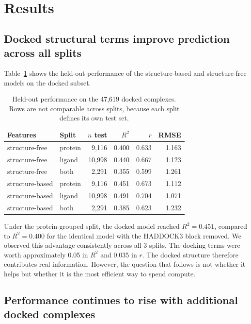 \documentclass[times, twoside]{zHenriquesLab-StyleBioRxiv}
\begin{document}
\section*{Results}

\subsection*{Docked structural terms improve prediction across all splits}

Table~\ref{tab:phase1} shows the held-out performance of the structure-based and structure-free models on the docked subset.

\begin{table}[h]
\centering
\caption{Held-out performance on the 47,619 docked complexes. Rows are not comparable across splits, because each split defines its own test set.}
\label{tab:phase1}
\small
\begin{tabular}{llrrrr}
\toprule
Features & Split & $n$ test & $R^2$ & $r$ & RMSE \\
\midrule
structure-free  & protein & 9,116  & 0.400 & 0.633 & 1.163 \\
structure-free  & ligand  & 10,998 & 0.440 & 0.667 & 1.123 \\
structure-free  & both    & 2,291  & 0.355 & 0.599 & 1.261 \\
structure-based & protein & 9,116  & 0.451 & 0.673 & 1.112 \\
structure-based & ligand  & 10,998 & 0.491 & 0.704 & 1.071 \\
structure-based & both    & 2,291  & 0.385 & 0.623 & 1.232 \\
\bottomrule
\end{tabular}
\end{table}

Under the protein-grouped split, the docked model reached $R^2 = 0.451$, compared to $R^2 = 0.400$ for the identical model with the HADDOCK3 block removed. We observed this advantage consistently across all 3 splits. The docking terms were worth approximately 0.05 in $R^2$ and 0.035 in $r$. The docked structure therefore contributes real information. However, the question that follows is not whether it helps but whether it is the most efficient way to spend compute.

\subsection*{Performance continues to rise with additional docked complexes}
\end{document}

